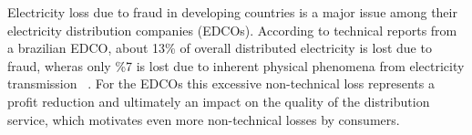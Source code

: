 Electricity loss due to fraud in developing countries is a major issue among
their electricity distribution companies (EDCOs).
According to technical reports from a brazilian EDCO, about 13\% of overall
distributed electricity is lost due to fraud, wheras only \%7 is lost due to
inherent physical phenomena from electricity transmission~\cite{ANEEL2012} .
For the EDCOs this excessive non-technical loss represents a profit reduction
and ultimately an impact on the quality of the distribution service, which
motivates even more non-technical losses by consumers.




